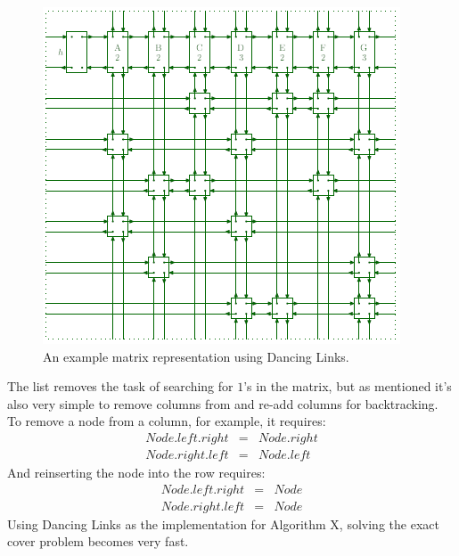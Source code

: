     \begin{figure}[H]
        \centering
        \includegraphics[scale=0.70]{dlx.png}
        \caption{An example matrix representation using Dancing Links.}
        \label{fig:dlx}
    \end{figure}
    The list removes the task of searching for $1$'s in the matrix, but as mentioned it's also very simple to remove columns from and
    re-add columns for backtracking. To remove a node from a column, for example, it requires:
    \begin{eqnarray}
        Node.left.right &=& Node.right  \nonumber   \\  
        Node.right.left &=& Node.left   \nonumber
    \end{eqnarray}
    And reinserting the node into the row requires:
    \begin{eqnarray}
        Node.left.right &=& Node    \nonumber   \\  
        Node.right.left &=& Node    \nonumber
    \end{eqnarray}
    Using Dancing Links as the implementation for Algorithm X, solving the exact cover problem becomes very fast.
    
